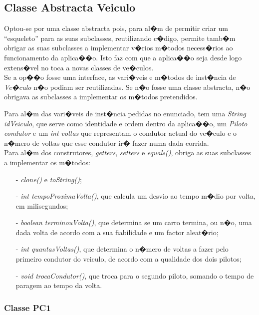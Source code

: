 ﻿\documentclass[10pt,notitlepage]{article}
\begin{document}
\subsection{Classe Abstracta Veiculo}

Optou-se por uma classe abstracta pois, para al�m de permitir criar um ``esqueleto'' para as suas subclasses, reutilizando c�digo, permite tamb�m obrigar as suas subclasses a implementar v�rios m�todos necess�rios ao funcionamento da aplica��o. Isto faz com que a aplica��o seja desde logo extens�vel no toca a novas classes de ve�culos. \\

Se a op��o fosse uma interface, as vari�veis e m�todos de inst�ncia de \textit{Ve�culo} n�o podiam ser reutilizadas. Se n�o fosse uma classe abstracta, n�o obrigava as subclasses a implementar os m�todos pretendidos.

Para al�m das vari�veis de inst�ncia pedidas no enunciado, tem uma \textit{String idVeiculo}, que serve como identidade e ordem dentro da aplica��o, um \textit{Piloto condutor} e um \textit{int voltas} que representam o condutor actual do ve�culo e o n�mero de voltas que esse condutor ir� fazer numa dada corrida. \\

Para al�m dos construtores, \textit{getters}, \textit{setters} e \textit{equals()}, obriga as suas subclasses a implementar os m�todos:

\begin{itemize}
\item[-] \textit{clone()} e \textit{toString()};
\item[-] \textit{int tempoProximaVolta()}, que calcula um desvio ao tempo m�dio por volta, em milisegundos;
\item[-] \textit{boolean terminouVolta()}, que determina se um carro termina, ou n�o, uma dada volta de acordo com a sua fiabilidade e um factor aleat�rio;
\item[-] \textit{int quantasVoltas()}, que determina o n�mero de voltas a fazer pelo primeiro condutor do veiculo, de acordo com a qualidade dos dois pilotos;
\item[-] \textit{void trocaCondutor()}, que troca para o segundo piloto, somando o tempo de paragem ao tempo da volta.
\end{itemize}

\subsubsection{Classe PC1}
\end{document}
